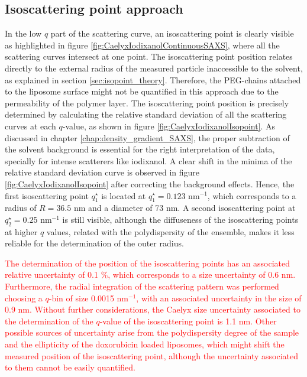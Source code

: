 \subsection{Isoscattering point approach}
In the low $q$ part of the scattering curve, an isoscattering point is clearly visible as highlighted in figure \ref{fig:CaelyxIodixanolContinuousSAXS}, where all the scattering curves intersect at one point. The isoscattering point position relates directly to the external radius of the measured particle inaccessible to the solvent, as explained in section \ref{sec:isopoint_theory}. Therefore, the PEG-chains attached to the liposome surface might not be quantified in this approach due to the permeability of the polymer layer. The isoscattering point position is precisely determined by calculating the relative standard deviation of all the scattering curves at each $q$-value, as shown in figure \ref{fig:CaelyxIodixanolIsopoint}. As discussed in chapter \ref{chap:density_gradient_SAXS}, the proper subtraction of the solvent background is essential for the right interpretation of the data, specially for intense scatterers like iodixanol. A clear shift in the minima of the relative standard deviation curve is observed in figure \ref{fig:CaelyxIodixanolIsopoint} after correcting the background effects. Hence, the first isoscattering point $q^{\star}_1$ is located at $q^{\star}_1 = 0.123$ nm$^{-1}$, which corresponds to a radius of $R = 36.5$ nm and a diameter of 73 nm. A second isoscattering point at $q^{\star}_2 = 0.25$ nm$^{-1}$ is still visible, although the diffuseness of the isoscattering points at higher $q$ values, related with the polydispersity of the ensemble, makes it less reliable for the determination of the outer radius.

\textcolor{red}{The determination of the position of the isoscattering points has an associated relative uncertainty of 0.1 $\%$, which corresponds to a size uncertainty of 0.6 nm. Furthermore, the radial integration of the scattering pattern was performed choosing a $q$-bin of size 0.0015 nm$^{-1}$, with an associated uncertainty in the size of 0.9 nm. Without further considerations, the Caelyx size uncertainty associated to the determination of the $q$-value of the isoscattering point is 1.1 nm. Other possible sources of uncertainty arise from the polydispersity degree of the sample and the ellipticity of the doxorubicin loaded liposomes, which might shift the measured position of the isoscattering point, although the uncertainty associated to them cannot be easily quantified.}

